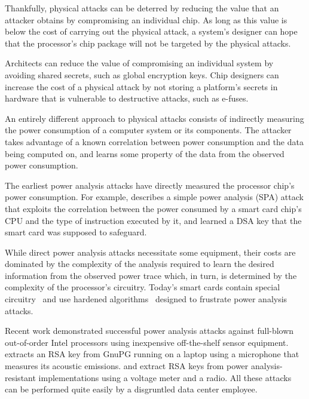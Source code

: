 Thankfully, physical attacks can be deterred by reducing the value that an
attacker obtains by compromising an individual chip. As long as this value is
below the cost of carrying out the physical attack, a system's designer can
hope that the processor's chip package will not be targeted by the physical
attacks.

Architects can reduce the value of compromising an individual system by
avoiding shared secrets, such as global encryption keys. Chip designers can
increase the cost of a physical attack by not storing a platform's secrets in
hardware that is vulnerable to destructive attacks, such as e-fuses.


\label{sec:power_analysis_attacks}

An entirely different approach to physical attacks consists of indirectly
measuring the power consumption of a computer system or its components. The
attacker takes advantage of a known correlation between power consumption and
the data being computed on, and learns some property of the data from the
observed power consumption.

The earliest power analysis attacks have directly measured the processor chip's
power consumption. For example, \cite{kocher1999dpa} describes a simple power
analysis (SPA) attack that exploits the correlation between the power consumed
by a smart card chip's CPU and the type of instruction executed by it, and
learned a DSA key that the smart card was supposed to safeguard.

While direct power analysis attacks necessitate some equipment, their costs are
dominated by the complexity of the analysis required to learn the desired
information from the observed power trace which, in turn, is determined by the
complexity of the processor's circuitry. Today's smart cards contain special
circuitry~\cite{tiri2002dcmos} and use hardened algorithms~\cite{herbst2006aes}
designed to frustrate power analysis attacks.

Recent work demonstrated successful power analysis attacks against full-blown
out-of-order Intel processors using inexpensive off-the-shelf sensor equipment.
\cite{genkin2014rsa} extracts an RSA key from GnuPG running on a laptop using a
microphone that measures its acoustic emissions. \cite{genkin2014fullpa} and
\cite{genkin2015radiopa} extract RSA keys from power analysis-resistant
implementations using a voltage meter and a radio. All these attacks can be
performed quite easily by a disgruntled data center employee.

